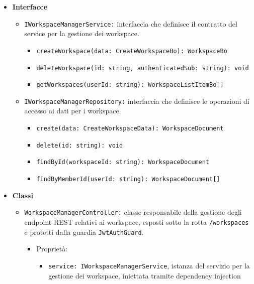 \documentclass[a4paper, 11pt]{article}
\begin{document}
\begin{itemize}
    \item \textbf{Interfacce}
    \begin{itemize}
    
        \item \texttt{IWorkspaceManagerService:} interfaccia che definisce il contratto del service per la gestione dei workspace.
        \begin{itemize}
            \item \texttt{createWorkspace(data: CreateWorkspaceBo): WorkspaceBo}             
            \item \texttt{deleteWorkspace(id: string, authenticatedSub: string): void} 
            \item \texttt{getWorkspaces(userId: string): WorkspaceListItemBo[]} 
        \end{itemize}
        
        \item \texttt{IWorkspaceManagerRepository:} interfaccia che definisce le operazioni di accesso ai dati per i workspace.
        \begin{itemize}
            \item \texttt{create(data: CreateWorkspaceData): WorkspaceDocument} 
            \item \texttt{delete(id: string): void} 
            \item \texttt{findById(workspaceId: string): WorkspaceDocument} 
            \item \texttt{findByMemberId(userId: string): WorkspaceDocument[]} 
        \end{itemize}
        
    \end{itemize}
    \item \textbf{Classi}
    \begin{itemize}

        \item \texttt{WorkspaceManagerController:} classe responsabile della gestione degli endpoint REST relativi ai workspace, esposti sotto la rotta \texttt{/workspaces} e protetti dalla guardia \texttt{JwtAuthGuard}.
        \begin{itemize}
          \item Proprietà:
          \begin{itemize}
            \item \texttt{service: IWorkspaceManagerService}, istanza del servizio per la gestione dei workspace, iniettata tramite dependency injection


\end{itemize}
\end{itemize}
\end{itemize}
\end{itemize}
\end{document}
